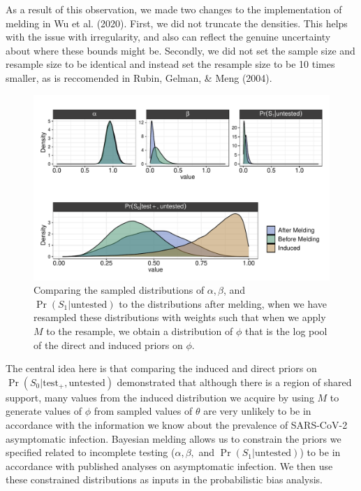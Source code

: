 \documentclass[12pt,twoside]{smiththesis}
\begin{document}
As a result of this observation, we made two changes to the implementation of melding in Wu et al. (2020). First, we did not truncate the densities. This helps with the issue with irregularity, and also can reflect the genuine uncertainty about where these bounds might be. Secondly, we did not set the sample size and resample size to be identical and instead set the resample size to be 10 times smaller, as is reccomended in Rubin, Gelman, \& Meng (2004).
\begin{figure}

{\centering \includegraphics[width=1\linewidth]{figure/meld-chap2} 

}

\caption{\label{fig:melded} Comparing the sampled distributions of $\alpha,\beta$, and $\Pr(S_1|\text{untested})$ to the distributions after melding, when we have resampled these distributions with weights such that when we apply $M$ to the resample, we obtain a distribution of $\phi$ that is the log pool of the direct and induced priors on $\phi$.}\label{fig:unnamed-chunk-19}
\end{figure}
The central idea here is that comparing the induced and direct priors on \(\Pr(S_0| \text{test}_+, \text{untested})\) demonstrated that although there is a region of shared support, many values from the induced distribution we acquire by using \(M\) to generate values of \(\phi\) from sampled values of \(\theta\) are very unlikely to be in accordance with the information we know about the prevalence of SARS-CoV-2 asymptomatic infection. Bayesian melding allows us to constrain the priors we specified related to incomplete testing (\(\alpha,\beta,\) and \(\Pr(S_1|\text{untested})\)) to be in accordance with published analyses on asymptomatic infection. We then use these constrained distributions as inputs in the probabilistic bias analysis.
\end{document}
